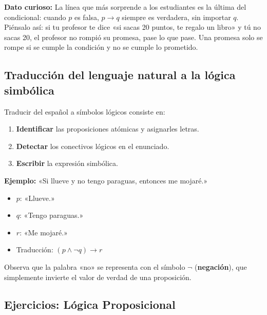 \documentclass[12pt, a4paper]{article}
\begin{document}
\begin{cuadroadvertencia}
\textbf{Dato curioso:} La línea que más sorprende a los estudiantes es la última del condicional: cuando $p$ es falsa, $p \rightarrow q$ siempre es verdadera, sin importar $q$. Piénsalo así: si tu profesor te dice «si sacas 20 puntos, te regalo un libro» y tú no sacas 20, el profesor no rompió su promesa, pase lo que pase. Una promesa solo se rompe si se cumple la condición y no se cumple lo prometido.
\end{cuadroadvertencia}

\subsection{Traducción del lenguaje natural a la lógica simbólica}

Traducir del español a símbolos lógicos consiste en:
\begin{enumerate}
  \item \textbf{Identificar} las proposiciones atómicas y asignarles letras.
  \item \textbf{Detectar} los conectivos lógicos en el enunciado.
  \item \textbf{Escribir} la expresión simbólica.
\end{enumerate}

\noindent\textbf{Ejemplo:} «Si llueve y no tengo paraguas, entonces me mojaré.»
\begin{itemize}
  \item $p$: «Llueve.»
  \item $q$: «Tengo paraguas.»
  \item $r$: «Me mojaré.»
  \item Traducción: $(p \wedge \neg q) \rightarrow r$
\end{itemize}

Observa que la palabra «no» se representa con el símbolo $\neg$ (\textbf{negación}), que simplemente invierte el valor de verdad de una proposición.

\newpage

\subsection{Ejercicios: Lógica Proposicional}
\end{document}
